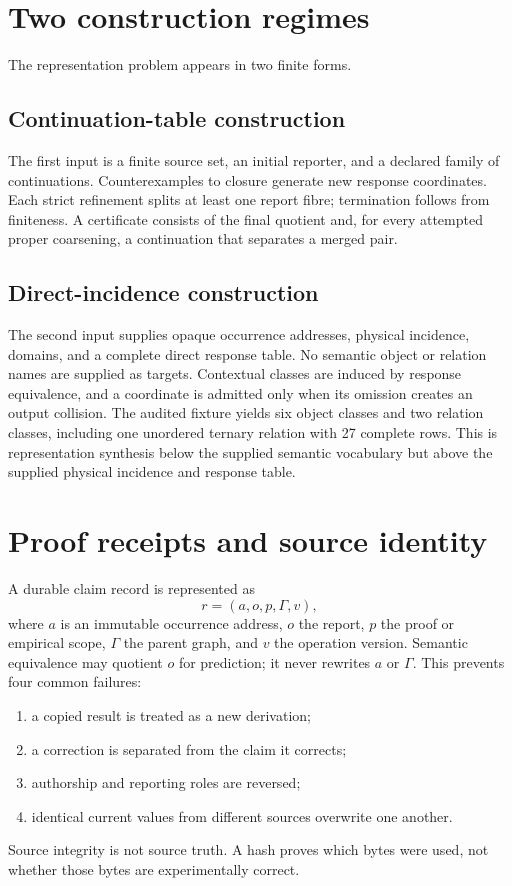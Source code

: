 \documentclass[11pt,a4paper]{article}
\begin{document}
\section{Two construction regimes}
The representation problem appears in two finite forms.

\subsection{Continuation-table construction}
The first input is a finite source set, an initial reporter, and a declared family of continuations. Counterexamples to closure generate new response coordinates. Each strict refinement splits at least one report fibre; termination follows from finiteness. A certificate consists of the final quotient and, for every attempted proper coarsening, a continuation that separates a merged pair.

\subsection{Direct-incidence construction}
The second input supplies opaque occurrence addresses, physical incidence, domains, and a complete direct response table. No semantic object or relation names are supplied as targets. Contextual classes are induced by response equivalence, and a coordinate is admitted only when its omission creates an output collision. The audited fixture yields six object classes and two relation classes, including one unordered ternary relation with 27 complete rows. This is representation synthesis below the supplied semantic vocabulary but above the supplied physical incidence and response table.

\section{Proof receipts and source identity}
A durable claim record is represented as
\begin{equation}
r=(a,o,p,\Gamma,v),
\end{equation}
where $a$ is an immutable occurrence address, $o$ the report, $p$ the proof or empirical scope, $\Gamma$ the parent graph, and $v$ the operation version. Semantic equivalence may quotient $o$ for prediction; it never rewrites $a$ or $\Gamma$. This prevents four common failures:
\begin{enumerate}
\item a copied result is treated as a new derivation;
\item a correction is separated from the claim it corrects;
\item authorship and reporting roles are reversed;
\item identical current values from different sources overwrite one another.
\end{enumerate}
Source integrity is not source truth. A hash proves which bytes were used, not whether those bytes are experimentally correct.
\end{document}
